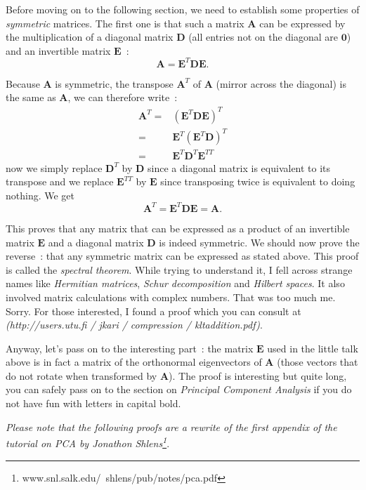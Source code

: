 \documentclass[11pt,twocolumn]{amsart} %
\newcommand{\ve}[1]{\boldsymbol{#1}}
\newcommand{\ma}[1]{\boldsymbol{#1}}
\begin{document}
Before moving on to the following section, we need to establish some properties of \emph{symmetric} matrices. The first one is that such a matrix $\ma{A}$ can be expressed by the multiplication of a diagonal matrix $\ma{D}$ (all entries not on the diagonal are $\ve{0}$) and an invertible matrix $\ma{E}$~:
\begin{equation}
  \ma{A} = \ma{E}^T\ma{D}\ma{E}. \label{symmetric}
\end{equation}

Because $\ma{A}$ is symmetric, the transpose $\ma{A}^T$ of $\ma{A}$ (mirror across the diagonal) is the same as $\ma{A}$, we can therefore write~:
\begin{align*}
  \ma{A}^T = & (\ma{E}^T\ma{D}\ma{E})^T \\
           = &  \ma{E}^T(\ma{E}^T\ma{D})^T \\
           = &  \ma{E}^T\ma{D}^T\ma{E}^{TT}
\end{align*}
now we simply replace $\ma{D}^T$ by $\ma{D}$ since a diagonal matrix is equivalent to its transpose and we replace $\ma{E}^{TT}$ by $\ma{E}$ since transposing twice is equivalent to doing nothing. We get
\[
  \ma{A}^T = \ma{E}^T\ma{D}\ma{E} = \ma{A}.
\]

This proves that any matrix that can be expressed as a product of an invertible matrix $\ma{E}$ and a diagonal matrix $\ma{D}$ is indeed symmetric. We should now prove the reverse~: that any symmetric matrix can be expressed as stated above. This proof is called the \emph{spectral theorem}. While trying to understand it, I fell across strange names like \emph{Hermitian matrices}, \emph{Schur decomposition} and \emph{Hilbert spaces}. It also involved matrix calculations with complex numbers. That was too much me. Sorry. For those interested, I found a proof which you can consult at \emph{(http://users.utu.fi / jkari / compression / kltaddition.pdf)}.

Anyway, let's pass on to the interesting part~: the matrix $\ma{E}$ used in the little talk above is in fact a matrix of the orthonormal eigenvectors of $\ma{A}$ (those vectors that do not rotate when transformed by $\ma{A}$). The proof is interesting but quite long, you can safely pass on to the section on \emph{Principal Component Analysis} if you do not have fun with letters in capital bold.

\emph{Please note that the following proofs are a rewrite of the first appendix of the tutorial on PCA by Jonathon Shlens\footnote{www.snl.salk.edu/~shlens/pub/notes/pca.pdf}}.
\end{document}

